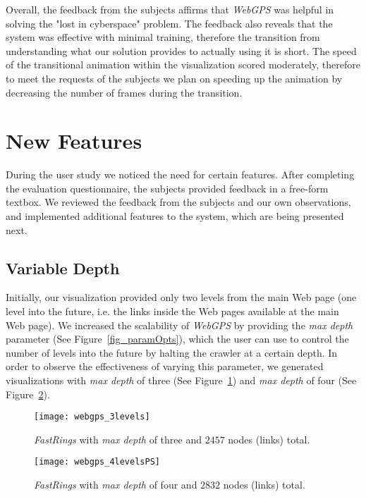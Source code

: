 \documentclass[10pt,psfig]{article}
\begin{document}
{\begin{itemize}
\end{itemize}

Overall, the feedback from the subjects affirms that {\em WebGPS} was helpful in solving the "lost in cyberspace" problem.
The feedback also reveals that the system was effective with minimal training, therefore the transition from understanding what our solution provides to actually using it is short.
The speed of the transitional animation within the visualization scored moderately, therefore to meet the requests of the subjects we plan on speeding up the animation by decreasing the number of frames during the transition. 

\section{New Features}
\label{se:new_features}

During the user study we noticed the need for certain features.
After completing the evaluation questionnaire, the subjects provided feedback in a free-form textbox.
We reviewed the feedback from the subjects and our own observations, and implemented additional features to the system, which are being presented next.

\subsection{Variable Depth}
\label{ss:var_depth}

Initially, our visualization provided only two levels from the main Web page (one level into the future, i.e. the links inside the Web pages available at the main Web page).
We increased the scalability of {\em WebGPS} by providing the {\em max depth} parameter (See Figure~\ref{fig_paramOpts}), which the user can use to control the number of levels into the future by halting the crawler at a certain depth.
In order to observe the effectiveness of varying this parameter, we generated visualizations with {\em max depth} of three (See Figure~\ref{fig_3levels}) and {\em max depth} of four (See Figure~\ref{fig_4levels}).

\begin{figure}[t]
\centering
\texttt{[image: webgps\_3levels]}
\caption{{\em FastRings} with {\em max depth} of three and $2457$ nodes (links) total.}
\label{fig_3levels}
\end{figure}

\begin{figure}[t]
\centering
\texttt{[image: webgps\_4levelsPS]}
\caption{{\em FastRings} with {\em max depth} of four and $2832$ nodes (links) total.}
\label{fig_4levels}
\end{figure}

}
\end{document}
